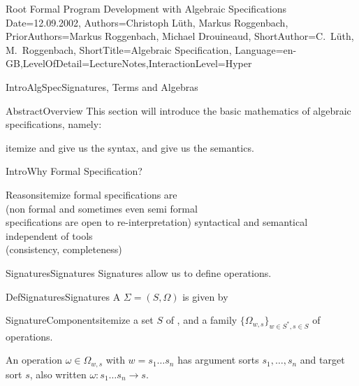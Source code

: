 \documentclass[landscape, slides, light]{mmiss2}
\begin{document}
\begin{Package}{Root}
{Formal Program Development with Algebraic Specifications}
{Date=12.09.2002,
Authors={Christoph L\"uth, Markus Roggenbach},
PriorAuthors={Markus Roggenbach, Michael Drouineaud},
ShortAuthor={C.~L\"uth, M.~Roggenbach},
ShortTitle={Algebraic Specification},
Language=en-GB,LevelOfDetail=LectureNotes,InteractionLevel=Hyper}

\begin{Section}{IntroAlgSpec}{Signatures, Terms and Algebras}{}

\begin{Abstract}{Abstract}{Overview}{}
This section will introduce the basic mathematics of algebraic
specifications, namely:
\begin{List}{}{itemize}{}
  \ListItem{}  and  give us the syntax,
  \ListItem{} and  give us the semantics.
\end{List}  
\end{Abstract}

\begin{Introduction}{Intro}{Why Formal Specification?}{}
\begin{List}{Reasons}{itemize}{}
\ListItem{}
formal specifications are   \\
(non formal and sometimes even semi formal \\
specifications are open to re-interpretation)\pause
\ListItem{}
syntactical and semantical  \\ 
independent of tools 
\pause
\ListItem{}
 \\
(consistency, completeness)
\end{List}
\end{Introduction}

\begin{Paragraph}{Signatures}{Signatures}{}
Signatures allow us to define operations.

\begin{Definition}{DefSignatures}{Signatures}{}
A  $\Sigma=(S, \Omega)$ is given by 
\begin{List}{SignatureComponents}{itemize}{}
    \ListItem{} a set $S$ of , and 
    \ListItem{} a family $\{\Omega_{w,s}\}_{w\in S^{*},s\in S}$ of operations. 
  \end{List}
\end{Definition}

An operation $\omega\in\Omega_{w,s}$ with $w=s_1\ldots s_n$ has
argument sorts $s_1,\ldots,s_n$ and target sort $s$, also written
$\omega:s_1\ldots s_n\rightarrow s$.
\end{Paragraph}


\end{Section}
\end{Package}
\end{document}
